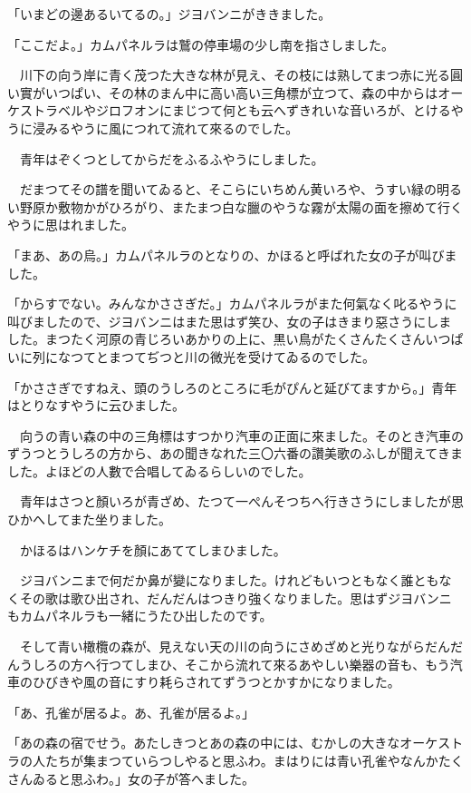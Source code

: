 \documentclass[tate,paper=b6j,jafontsize=9pt]{jlreq}
\begin{document}
「いまどの邊あるいてるの。」ジヨバンニがききました。

「ここだよ。」カムパネルラは鷲の停車場の少し南を指さしました。

　川下の向う岸に青く茂つた大きな林が見え、その枝には熟してまつ赤に光る圓い實がいつぱい、その林のまん中に高い高い三角標が立つて、森の中からはオーケストラベルやジロフオンにまじつて何とも云へずきれいな音いろが、とけるやうに浸みるやうに風につれて流れて來るのでした。

　青年はぞくつとしてからだをふるふやうにしました。

　だまつてその譜を聞いてゐると、そこらにいちめん黄いろや、うすい緑の明るい野原か敷物かがひろがり、またまつ白な臘のやうな霧が太陽の面を擦めて行くやうに思はれました。

「まあ、あの烏。」カムパネルラのとなりの、かほると呼ばれた女の子が叫びました。

「からすでない。みんなかささぎだ。」カムパネルラがまた何氣なく叱るやうに叫びましたので、ジヨバンニはまた思はず笑ひ、女の子はきまり惡さうにしました。まつたく河原の青じろいあかりの上に、黒い鳥がたくさんたくさんいつぱいに列になつてとまつてぢつと川の微光を受けてゐるのでした。

「かささぎですねえ、頭のうしろのところに毛がぴんと延びてますから。」青年はとりなすやうに云ひました。

　向うの青い森の中の三角標はすつかり汽車の正面に來ました。そのとき汽車のずうつとうしろの方から、あの聞きなれた三〇六番の讚美歌のふしが聞えてきました。よほどの人數で合唱してゐるらしいのでした。

　青年はさつと顏いろが青ざめ、たつて一ぺんそつちへ行きさうにしましたが思ひかへしてまた坐りました。

　かほるはハンケチを顏にあててしまひました。

　ジヨバンニまで何だか鼻が變になりました。けれどもいつともなく誰ともなくその歌は歌ひ出され、だんだんはつきり強くなりました。思はずジヨバンニもカムパネルラも一緒にうたひ出したのです。

　そして青い橄欖の森が、見えない天の川の向うにさめざめと光りながらだんだんうしろの方へ行つてしまひ、そこから流れて來るあやしい樂器の音も、もう汽車のひびきや風の音にすり耗らされてずうつとかすかになりました。

「あ、孔雀が居るよ。あ、孔雀が居るよ。」

「あの森の宿でせう。あたしきつとあの森の中には、むかしの大きなオーケストラの人たちが集まつていらつしやると思ふわ。まはりには青い孔雀やなんかたくさんゐると思ふわ。」女の子が答へました。
\end{document}
